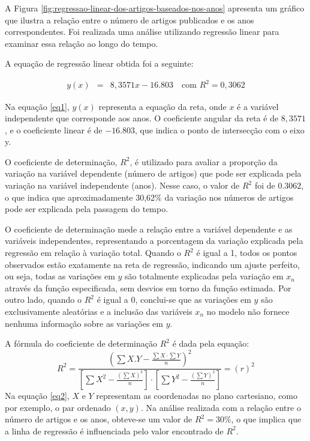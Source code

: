 


A Figura \ref{fig:regressao-linear-dos-artigos-baseados-nos-anos} apresenta um gráfico que ilustra a relação entre o número de artigos publicados e os anos correspondentes. Foi realizada uma análise utilizando regressão linear para examinar essa relação ao longo do tempo.

A equação de regressão linear obtida foi a seguinte:

\begin{eqnarray}
	y(x) &=& 8,3571x - 16.803 \quad \text{com } R^2 = 0,3062\label{eq1}
\end{eqnarray}

Na equação \eqref{eq1}, $y(x)$ representa a equação da reta, onde $x$ é a variável independente que corresponde aos anos. O coeficiente angular da reta é de $8,3571$, e o coeficiente linear é de $-16.803$, que indica o ponto de intersecção com o eixo y.

O coeficiente de determinação, $R^2$, é utilizado para avaliar a proporção da variação na variável dependente (número de artigos) que pode ser explicada pela variação na variável independente (anos). Nesse caso, o valor de $R^2$ foi de $0.3062$, o que indica que aproximadamente 30,62\% da variação nos números de artigos pode ser explicada pela passagem do tempo.

O coeficiente de determinação mede a relação entre a variável dependente e as variáveis independentes, representando a porcentagem da variação explicada pela regressão em relação à variação total. Quando o $R^2$ é igual a 1, todos os pontos observados estão exatamente na reta de regressão, indicando um ajuste perfeito, ou seja, todas as variações em $y$ são totalmente explicadas pela variação em $x_n$ através da função especificada, sem desvios em torno da função estimada. Por outro lado, quando o $R^2$ é igual a 0, conclui-se que as variações em $y$ são exclusivamente aleatórias e a inclusão das variáveis $x_n$ no modelo não fornece nenhuma informação sobre as variações em $y$.

A fórmula do coeficiente de determinação $R^2$ é dada pela equação:
\begin{equation}
	R^{2}=\frac{\left(\sum X . Y-\frac{\sum X \cdot \sum Y}{n}\right)^{2}}{\left[\sum X^{2}-\frac{\left(\sum X\right)^{2}}{n}\right] \cdot\left[\sum Y^{2}-\frac{\left(\sum Y\right)^{2}}{n}\right]}=(r)^{2}\label{eq2}
\end{equation}
Na equação \eqref{eq2}, $X$ e $Y$ representam as coordenadas no plano cartesiano, como por exemplo, o par ordenado $(x,y)$. Na análise realizada com a relação entre o número de artigos e os anos, obteve-se um valor de $R^2=30\%$, o que implica que a linha de regressão é influenciada pelo valor encontrado de $R^2$.

